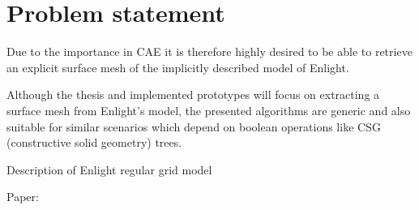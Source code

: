 
\section{Problem statement}

Due to the importance in CAE it is therefore highly desired to be able to retrieve an explicit surface mesh of the implicitly described model of Enlight.



Although the thesis and implemented prototypes will focus on extracting a surface mesh from Enlight's model, the presented algorithms are generic and also suitable for similar scenarios which depend on boolean operations like CSG (constructive solid geometry) trees.

Description of Enlight regular grid model

Paper: \cite{enlight}